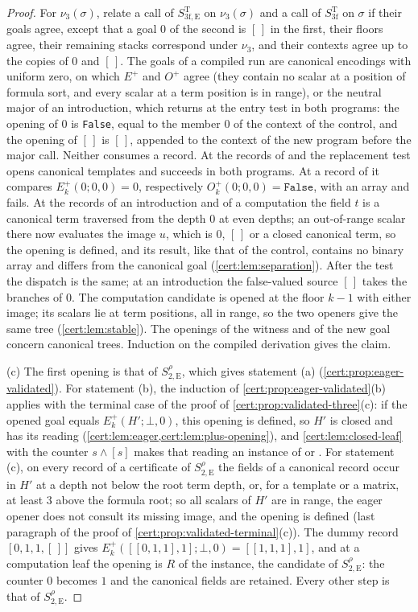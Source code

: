 \begin{proof}
For $\nu_3(\sigma)$, relate a call of $S^{\mathrm T}_{3\mathrm f,\mathrm E}$ on
$\nu_3(\sigma)$ and a call of $S^{\mathrm T}_{3\mathrm f}$ on $\sigma$ if their goals
agree, except that a goal $0$ of the second is $[\,]$ in the first, their floors agree,
their remaining stacks correspond under $\nu_3$, and their contexts agree up to the
copies of $0$ and $[\,]$. The goals of a compiled run are canonical encodings with
uniform zero, on which $E^{+}$ and $O^{+}$ agree (they contain no scalar at a position
of formula sort, and every scalar at a term position is in range), or the neutral
major of an introduction, which returns at the entry test in both programs: the
opening of $0$ is \texttt{False}, equal to the member $0$ of the context of the control,
and the opening of $[\,]$ is $[\,]$, appended to the context of the new program before
the major call. Neither consumes a record. At the records of  and
 the replacement test opens canonical templates and succeeds in both
programs. At a record of  it compares $E^{+}_k(0;0,0)=0$, respectively
$O^{+}_k(0;0,0)=\texttt{False}$, with an array and fails. At the records of an
introduction and of a computation the field $t$ is a canonical term traversed from
the depth $0$ at even depths; an out-of-range scalar there now evaluates the image
$u$, which is $0$, $[\,]$ or a closed canonical term, so the opening is defined, and
its result, like that of the control, contains no binary array and differs from the
canonical goal (\cref{cert:lem:separation}). After the test the dispatch is the same;
at an introduction the false-valued source $[\,]$ takes the branches of $0$. The
computation candidate is opened at the floor $k-1$ with either image; its scalars lie
at term positions, all in range, so the two openers give the same tree
(\cref{cert:lem:stable}). The openings of the witness and of the new goal concern
canonical trees. Induction on the compiled derivation gives the claim.

(c) The first opening is that of $S^{\rho}_{2,\mathrm E}$, which gives statement (a)
(\cref{cert:prop:eager-validated}). For statement (b), the induction of
\cref{cert:prop:eager-validated}(b) applies with the terminal case of the proof of
\cref{cert:prop:validated-three}(c): if the opened goal equals $E^{+}_k(H';\bot,0)$,
this opening is defined, so $H'$ is closed and has its reading
(\cref{cert:lem:eager,cert:lem:plus-opening}), and \cref{cert:lem:closed-leaf} with
the counter $s\land[s]$ makes that reading an instance of  or
. For statement (c), on every record of a certificate of
$S^{\rho}_{2,\mathrm E}$ the fields of a canonical record occur in $H'$ at a depth not
below the root term depth, or, for a template or a matrix, at least $3$ above the
formula root; so all scalars of $H'$ are in range, the eager opener does not consult
its missing image, and the opening is defined (last paragraph of the proof of
\cref{cert:prop:validated-terminal}(c)). The dummy record $[0,1,1,[\,]]$ gives
$E^{+}_k([[0,1,1],1];\bot,0)=[[1,1,1],1]$, and at a computation leaf the opening is
$R$ of the instance, the candidate of $S^{\rho}_{2,\mathrm E}$: the counter $0$
becomes $1$ and the canonical fields are retained. Every other step is that of
$S^{\rho}_{2,\mathrm E}$.
\end{proof}
